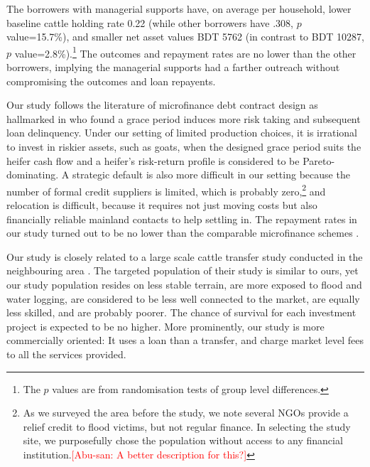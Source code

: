 	 The borrowers with managerial supports have, on average per household, lower baseline cattle holding rate 0.22 (while other borrowers have .308, $p$ value=15.7\%), and smaller net asset values BDT 5762 (in contrast to BDT 10287, $p$ value=2.8\%).\footnote{The $p$ values are from randomisation tests of group level differences. } The outcomes and repayment rates are no lower than the other borrowers, implying the managerial supports had a farther outreach without compromising the outcomes and loan repayents. 

	Our study follows the literature of microfinance debt contract design as hallmarked in \citet{Field2013} who found a grace period induces more risk taking and subsequent loan delinquency. Under our setting of limited production choices, it is irrational to invest in riskier assets, such as goats, when the designed grace period suits the heifer cash flow and a heifer's risk-return profile is considered to be Pareto-dominating. A strategic default is also more difficult in our setting because the number of formal credit suppliers is limited, which is probably zero,\footnote{As we surveyed the area before the study, we note several NGOs provide a relief credit to flood victims, but not regular finance. In selecting the study site, we purposefully chose the population without access to any financial institution.\textcolor{red}{[Abu-san: A better description for this?]} } and relocation is difficult, because it requires not just moving costs but also financially reliable mainland contacts to help settling in. The repayment rates in our study turned out to be no lower than the comparable microfinance schemes \citep{BanerjeeKarlanZinman2015}.

	Our study is closely related to a large scale cattle transfer study conducted in the neighbouring area \citep{BandieraBRAC2017, Balboni2020}. The targeted population of their study is similar to ours, yet our study population resides on less stable terrain, are more exposed to flood and water logging, are considered to be less well connected to the market, are equally less skilled, and are probably poorer. The chance of survival for each investment project is expected to be no higher. More prominently, our study is more commercially oriented: It uses a loan than a transfer, and charge market level fees to all the services provided. 


